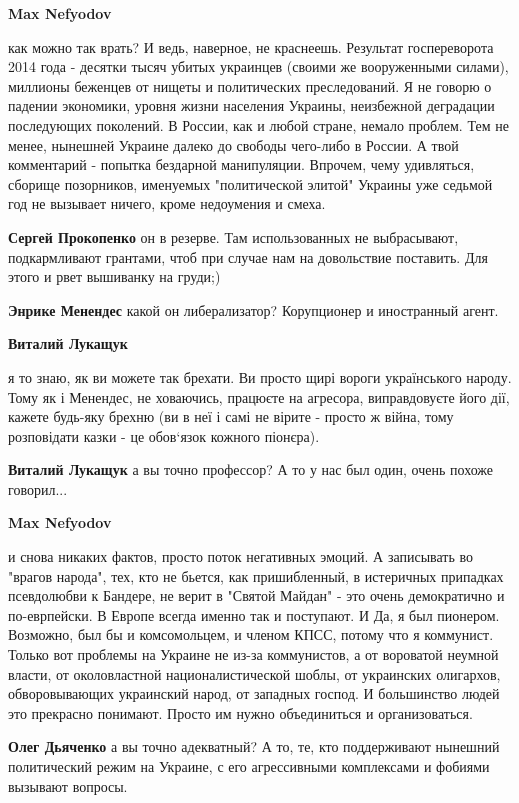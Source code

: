 \begin{itemize}
\begin{itemize}
\textbf{Max Nefyodov} 

как можно так врать? И ведь, наверное, не краснеешь. Результат госпереворота
2014 года - десятки тысяч убитых украинцев (своими же вооруженными силами),
миллионы беженцев от нищеты и политических преследований. Я не говорю о падении
экономики, уровня жизни населения Украины, неизбежной деградации последующих
поколений. В России, как и любой стране, немало проблем. Тем не менее, нынешней
Украине далеко до свободы чего-либо в России. А твой комментарий - попытка
бездарной манипуляции. Впрочем, чему удивляться, сборище позорников, именуемых
"политической элитой" Украины уже седьмой год не вызывает ничего, кроме
недоумения и смеха.

\textbf{Сергей Прокопенко} он в резерве. Там использованных не выбрасывают, подкармливают грантами, чтоб при случае нам на довольствие поставить. Для этого и рвет вышиванку на груди;)

\textbf{Энрике Менендес} какой он либерализатор? Корупционер и иностранный агент.

\textbf{Виталий Лукащук} 

я то знаю, як ви можете так брехати. Ви просто щирі вороги українського народу.
Тому як і Менендес, не ховаючись, працюєте на агресора, виправдовуєте його дії,
кажете будь-яку брехню (ви в неї і самі не вірите - просто ж війна, тому
розповідати казки - це обов‘язок кожного піонєра).

\textbf{Виталий Лукащук} а вы точно профессор? А то у нас был один, очень похоже говорил...

\textbf{Max Nefyodov} 

и снова никаких фактов, просто поток негативных эмоций. А записывать во "врагов
народа", тех, кто не бьется, как пришибленный, в истеричных припадках
псевдолюбви к Бандере, не верит в "Святой Майдан" - это очень демократично и
по-еврпейски. В Европе всегда именно так и поступают. И Да, я был пионером.
Возможно, был бы и комсомольцем, и членом КПСС, потому что я коммунист. Только
вот проблемы на Украине не из-за коммунистов, а от вороватой неумной власти, от
околовластной националистической шоблы, от украинских олигархов, обворовывающих
украинский народ, от западных господ. И большинство людей это прекрасно
понимают. Просто им нужно объединиться и организоваться.

\textbf{Олег Дьяченко} а вы точно адекватный? А то, те, кто поддерживают нынешний политический режим на Украине, с его агрессивными комплексами и фобиями вызывают вопросы.


\end{itemize}
\end{itemize}

